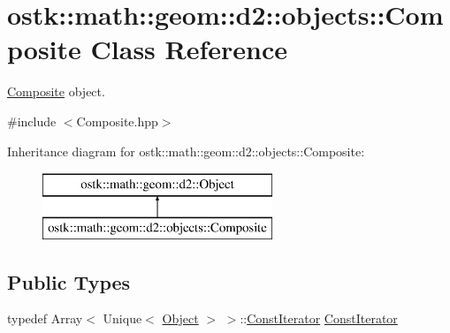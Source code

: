 \hypertarget{classostk_1_1math_1_1geom_1_1d2_1_1objects_1_1_composite}{}\section{ostk\+:\+:math\+:\+:geom\+:\+:d2\+:\+:objects\+:\+:Composite Class Reference}
\label{classostk_1_1math_1_1geom_1_1d2_1_1objects_1_1_composite}


\hyperlink{classostk_1_1math_1_1geom_1_1d2_1_1objects_1_1_composite}{Composite} object.  




{\ttfamily \#include $<$Composite.\+hpp$>$}

Inheritance diagram for ostk\+:\+:math\+:\+:geom\+:\+:d2\+:\+:objects\+:\+:Composite\+:\begin{figure}[H]
\begin{center}
\leavevmode
\includegraphics[height=2.000000cm]{classostk_1_1math_1_1geom_1_1d2_1_1objects_1_1_composite}
\end{center}
\end{figure}
\subsection*{Public Types}
\begin{DoxyCompactItemize}
\item 
typedef Array$<$ Unique$<$ \hyperlink{classostk_1_1math_1_1geom_1_1d2_1_1_object}{Object} $>$ $>$\+::\hyperlink{classostk_1_1math_1_1geom_1_1d2_1_1objects_1_1_composite_a848b806da9977737e1b100c1b51b39d9}{Const\+Iterator} \hyperlink{classostk_1_1math_1_1geom_1_1d2_1_1objects_1_1_composite_a848b806da9977737e1b100c1b51b39d9}{Const\+Iterator}
\end{DoxyCompactItemize}
